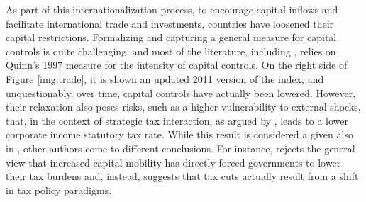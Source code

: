 As part of this internationalization process, to encourage capital inflows and facilitate international trade and investments, countries have loosened their capital restrictions. Formalizing and capturing a general measure for capital controls is quite challenging, and most of the literature, including \textcite{dev-loc-red-08}, relies on Quinn's 1997 measure for the intensity of capital controls. On the right side of Figure \ref{img:trade}, it is shown an updated 2011 version of the index, and unquestionably, over time, capital controls have actually been lowered. However, their relaxation also poses risks, such as a higher vulnerability to external shocks, that, in the context of strategic tax interaction, as argued by \textcite{dev-loc-red-08}, leads to a lower corporate income statutory tax rate. While this result is considered a given also in \textcite{clausing}, other authors come to different conclusions. For instance, \textcite{swank-98} rejects the general view that increased capital mobility has directly forced governments to lower their tax burdens and, instead, suggests that tax cuts actually result from a shift in tax policy paradigms.

